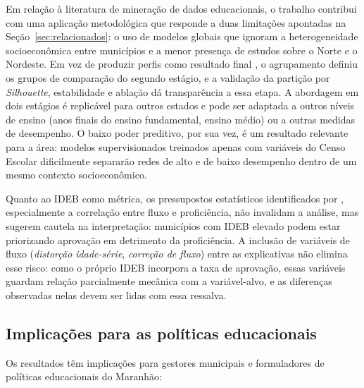 Em relação à literatura de mineração de dados educacionais, o trabalho contribui com uma aplicação metodológica que responde a duas limitações apontadas na Seção~\ref{sec:relacionados}: o uso de modelos globais que ignoram a heterogeneidade socioeconômica entre municípios e a menor presença de estudos sobre o Norte e o Nordeste. Em vez de produzir perfis como resultado final \citep{alves2014}, o agrupamento definiu os grupos de comparação do segundo estágio, e a validação da partição por \textit{Silhouette}, estabilidade e ablação dá transparência a essa etapa. A abordagem em dois estágios é replicável para outros estados e pode ser adaptada a outros níveis de ensino (anos finais do ensino fundamental, ensino médio) ou a outras medidas de desempenho. O baixo poder preditivo, por sua vez, é um resultado relevante para a área: modelos supervisionados treinados apenas com variáveis do Censo Escolar dificilmente separarão redes de alto e de baixo desempenho dentro de um mesmo contexto socioeconômico.

Quanto ao IDEB como métrica, os pressupostos estatísticos identificados por \citet{soares2013}, especialmente a correlação entre fluxo e proficiência, não invalidam a análise, mas sugerem cautela na interpretação: municípios com IDEB elevado podem estar priorizando aprovação em detrimento da proficiência. A inclusão de variáveis de fluxo (\textit{distorção idade-série}, \textit{correção de fluxo}) entre as explicativas não elimina esse risco: como o próprio IDEB incorpora a taxa de aprovação, essas variáveis guardam relação parcialmente mecânica com a variável-alvo, e as diferenças observadas nelas devem ser lidas com essa ressalva.

\subsection{Implicações para as políticas educacionais}

Os resultados têm implicações para gestores municipais e formuladores de políticas educacionais do Maranhão:

